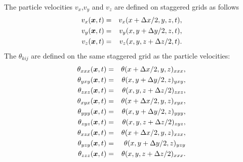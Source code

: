 \documentclass[11pt]{article}
\begin{document}
The particle velocities  $v_x$,$v_y$ and $v_z$ are defined on staggered grids
as follows
%
\begin{eqnarray}
  v_x(\mbox{\boldmath $x$}, t) & = & v_x(x+\Delta x/2, y, z, t),\nonumber\\
  v_y(\mbox{\boldmath $x$}, t) & = & v_y(x, y+\Delta y/2, z, t),\nonumber\\
  v_z(\mbox{\boldmath $x$}, t) & = & v_z(x, y, z+\Delta z/2, t).
\end{eqnarray}
%
The $\theta_{kij}$ are defined on the same staggered grid as the
particle velocities:
\begin{eqnarray}
  \theta_{xxx}(\mbox{\boldmath $x$}, t) & = & \theta(x+\Delta x/2,y,z)_{xxx},\nonumber\\
  \theta_{yxy}(\mbox{\boldmath $x$}, t) & = & \theta(x,y+\Delta y/2,z)_{yxy},\nonumber\\
  \theta_{zxz}(\mbox{\boldmath $x$}, t) & = & \theta(x,y,z+\Delta z/2)_{zxz},\nonumber\\
  \theta_{xyx}(\mbox{\boldmath $x$}, t) & = & \theta(x+\Delta x/2,y,z)_{xyx},\nonumber\\
  \theta_{yyy}(\mbox{\boldmath $x$}, t) & = & \theta(x,y+\Delta y/2,z)_{yyy},\nonumber\\
  \theta_{zyz}(\mbox{\boldmath $x$}, t) & = & \theta(x,y,z+\Delta z/2  )_{zyz},\nonumber\\
  \theta_{xzx}(\mbox{\boldmath $x$}, t) & = & \theta(x+\Delta x/2,y,z)_{xzx},\nonumber\\
  \theta_{yzy}(\mbox{\boldmath $x$}, t) & = & \theta(x,y+\Delta y/2,z)_{yzy}\nonumber\\
  \theta_{zzz}(\mbox{\boldmath $x$}, t) & = & \theta(x,y,z+\Delta z/2)_{xxx}.
\end{eqnarray}
\end{document}
